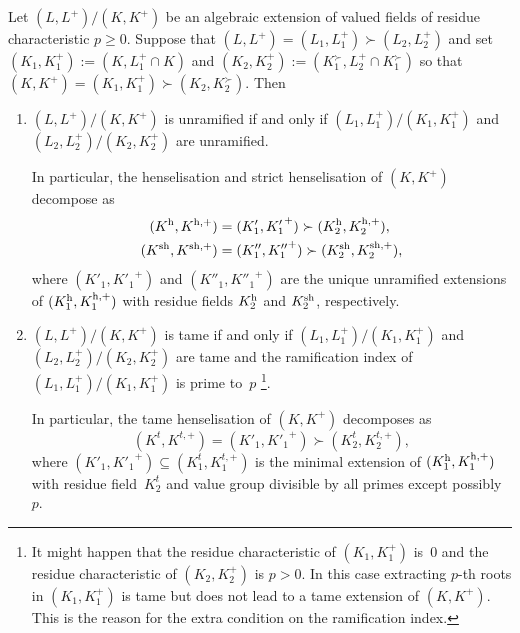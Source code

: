 \begin{prop} \label{composition-tame}
    Let $(L,L^+)/(K,K^+)$ be an algebraic extension of valued fields of residue characteristic $p \ge 0$.
    Suppose that $(L,L^+) = (L_1,L_1^+) \succ (L_2,L_2^+)$ and set $(K_1,K_1^+) := (K,L_1^+ \cap K)$ and $(K_2,K_2^+) := (K_1^\succ,L_2^+ \cap K_1^\succ)$ so that $(K,K^+) = (K_1,K_1^+) \succ (K_2,K_2^\succ)$.
    Then
    \begin{enumerate}[ref=(\arabic*)]
        \item \label{lemitem:composition etale}
        $(L,L^+)/(K,K^+)$ is unramified if and only if $(L_1,L_1^+)/(K_1,K_1^+)$ and $(L_2,L_2^+)/(K_2,K_2^+)$ are unramified.
        
        In particular, the henselisation and strict henselisation of $(K,K^+)$ decompose as
        \begin{align*}
            (K^{\rm h},K^{{\rm h},+}) &= (K'_1,{K'_1}^+) \succ (K_2^{\rm h},K_2^{{\rm h},+}),   \\
            (K^{\rm sh},K^{{\rm sh},+}) &= (K''_1,{K''_1}^+) \succ (K_2^{\rm sh},K_2^{{\rm sh},+}),
        \end{align*}
        where $(K'_1,{K'_1}^+)$ and $(K''_1,{K''_1}^+)$ are the unique unramified extensions of $(K_1^{\rm h},K_1^{{\rm h},+})$ with residue fields $K_2^{\rm h}$ and $K_2^{\rm sh}$, respectively.
        \item \label{lemitem:composition tame}
        $(L,L^+)/(K,K^+)$ is tame if and only if $(L_1,L_1^+)/(K_1,K_1^+)$ and $(L_2,L_2^+)/(K_2,K_2^+)$ are tame and the ramification index of $(L_1,L_1^+)/(K_1,K_1^+)$ is prime to~$p$ \footnote{It might happen that the residue characteristic of $(K_1,K_1^+)$ is~$0$ and the residue characteristic of $(K_2,K_2^+)$ is $p > 0$.
        In this case extracting $p$-th roots in $(K_1,K_1^+)$ is tame but does not lead to a tame extension of $(K,K^+)$.
        This is the reason for the extra condition on the ramification index.}.

        In particular, the tame henselisation of $(K,K^+)$ decomposes as
        \[
            (K^t,K^{t,+}) = (K'_1,{K'_1}^+) \succ (K_2^t,K_2^{t,+}),
        \]
         where $(K'_1,{K'_1}^+) \subseteq (K_1^t,K_1^{t,+})$ is the minimal extension of $(K_1^{\rm h},K_1^{{\rm h},+})$ with residue field~$K_2^t$ and value group divisible by all primes except possibly~$p$.
    \end{enumerate}
\end{prop}


